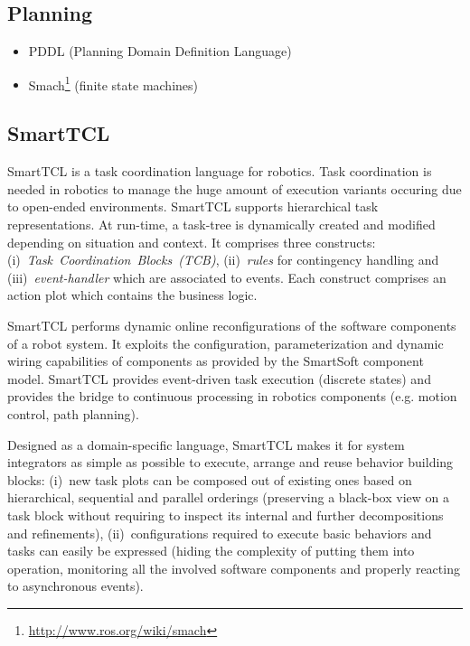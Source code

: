 \documentclass[jou]{apa}
\begin{document}
\subsection{Planning}
\begin{itemize}
\item PDDL (Planning Domain Definition Language)
\item Smach\footnote{\url{http://www.ros.org/wiki/smach}} (finite state machines)
\end{itemize}

\subsection{SmartTCL}

{\sc SmartTCL} \cite{Steck:2010vn} is a task coordination language for robotics. Task 
coordination is needed in robotics to manage the huge amount of execution variants occuring 
due to open-ended environments. {\sc SmartTCL} supports hierarchical task representations.
At run-time, a task-tree is dynamically created and modified depending on situation and
context. It comprises three constructs: \mbox{(i) {\em Task Coordination Blocks (TCB)}},
\mbox{(ii) {\em rules}} for contingency handling and \mbox{(iii) {\em event-handler}}
which are associated to events. Each construct comprises an action plot which contains
the business logic.

{\sc SmartTCL} performs dynamic online reconfigurations of the software components of
a robot system. It exploits the configuration, parameterization and dynamic wiring 
capabilities of components as provided by the {\sc SmartSoft} component model.
{\sc SmartTCL} provides event-driven task execution (discrete states) and provides
the bridge to continuous processing in robotics components (e.g. motion control, path
planning).

Designed as a domain-specific language, {\sc SmartTCL} makes it for system integrators 
as simple as possible to execute, arrange and reuse behavior building blocks: \mbox{(i) new}
task plots can be composed out of existing ones based on hierarchical, sequential and parallel 
orderings (preserving a black-box view on a task block without requiring to inspect its internal
and further decompositions and refinements), \mbox{(ii) configurations} required to execute
basic behaviors and tasks can easily be expressed (hiding the complexity of putting them into 
operation, monitoring all the involved software components and properly reacting to asynchronous
events). 
\end{document}
